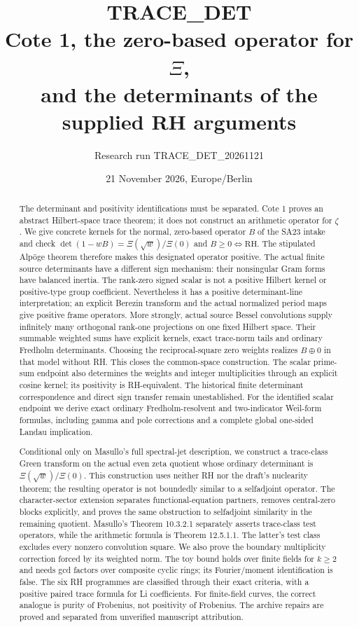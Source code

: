 \documentclass[11pt,a4paper]{article}
\title{\textbf{TRACE\_DET}\\Cote 1, the zero-based operator for $\Xi$,\\and the determinants of the supplied RH arguments}
\author{Research run TRACE\_DET\_20261121}
\date{21 November 2026, Europe/Berlin}
\begin{document}
\maketitle
\begin{abstract}
The determinant and positivity identifications must be separated. Cote 1 proves an abstract Hilbert-space trace theorem; it does not construct an arithmetic operator for $\zeta$. We give concrete kernels for the normal, zero-based operator $B$ of the SA23 intake and check $\det(1-wB)=\Xi(\sqrt w)/\Xi(0)$ and $B\ge0\Longleftrightarrow\mathrm{RH}$. The stipulated Alp\"oge theorem therefore makes this designated operator positive. The actual finite source determinants have a different sign mechanism: their nonsingular Gram forms have balanced inertia. The rank-zero signed scalar is not a positive Hilbert kernel or positive-type group coefficient. Nevertheless it has a positive determinant-line interpretation; an explicit Berezin transform and the actual normalized period maps give positive frame operators. More strongly, actual source Bessel convolutions supply infinitely many orthogonal rank-one projections on one fixed Hilbert space. Their summable weighted sums have explicit kernels, exact trace-norm tails and ordinary Fredholm determinants. Choosing the reciprocal-square zero weights realizes $B\oplus0$ in that model without RH. This closes the common-space construction. The scalar prime-sum endpoint also determines the weights and integer multiplicities through an explicit cosine kernel; its positivity is RH-equivalent. The historical finite determinant correspondence and direct sign transfer remain unestablished. For the identified scalar endpoint we derive exact ordinary Fredholm-resolvent and two-indicator Weil-form formulas, including gamma and pole corrections and a complete global one-sided Landau implication.

Conditional only on Masullo's full spectral-jet description, we construct a trace-class Green transform on the actual even zeta quotient whose ordinary determinant is $\Xi(\sqrt w)/\Xi(0)$. This construction uses neither RH nor the draft's nuclearity theorem; the resulting operator is not boundedly similar to a selfadjoint operator. The character-sector extension separates functional-equation partners, removes central-zero blocks explicitly, and proves the same obstruction to selfadjoint similarity in the remaining quotient. Masullo's Theorem 10.3.2.1 separately asserts trace-class test operators, while the arithmetic formula is Theorem 12.5.1.1. The latter's test class excludes every nonzero convolution square. We also prove the boundary multiplicity correction forced by its weighted norm. The toy bound holds over finite fields for $k\ge2$ and needs gcd factors over composite cyclic rings; its Fourier/moment identification is false. The six RH programmes are classified through their exact criteria, with a positive paired trace formula for Li coefficients. For finite-field curves, the correct analogue is purity of Frobenius, not positivity of Frobenius. The archive repairs are proved and separated from unverified manuscript attribution.
\end{abstract}
\clearpage
{\fontsize{9}{10.4}\selectfont\setlength{\parskip}{0pt}\tableofcontents}
\clearpage
\end{document}
